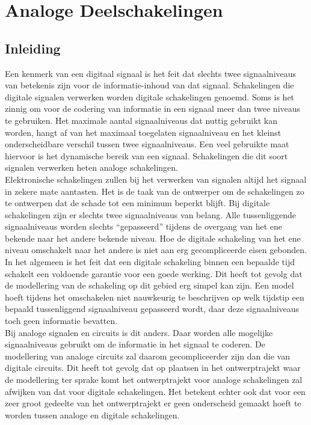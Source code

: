\section{Analoge Deelschakelingen}
\label{analoog}
\subsection{Inleiding}
Een kenmerk van een digitaal signaal is het feit dat slechts twee
signaalniveaus van betekenis zijn voor de informatie-inhoud van dat signaal.
Schakelingen die digitale signalen verwerken worden digitale schakelingen genoemd.
Soms is het zinnig om voor de codering van informatie in een signaal meer dan twee niveaus te gebruiken.
Het maximale aantal signaalniveaus dat nuttig gebruikt kan worden, hangt af van het maximaal toegelaten signaalniveau en het kleinst onderscheidbare verschil tussen twee signaalniveaus.
Een veel gebruikte maat hiervoor is het dynamische bereik van een signaal.
Schakelingen die dit soort signalen verwerken heten analoge schakelingen.
\\
Elektronische schakelingen zullen bij het verwerken van signalen altijd het signaal in zekere mate aantasten.
Het is de taak van de ontwerper om de schakelingen zo te ontwerpen dat de schade tot een minimum beperkt blijft.
Bij digitale schakelingen zijn er slechts twee signaalniveaus van belang.
Alle tussenliggende signaalniveaus worden slechts ``gepasseerd'' tijdens de overgang van het ene bekende naar het andere bekende niveau.
Hoe de digitale schakeling van het ene niveau omschakelt naar het andere is niet aan erg gecompliceerde eisen gebonden.
In het algemeen is het feit dat een digitale schakeling binnen een bepaalde tijd schakelt een voldoende garantie voor een goede werking.
Dit heeft tot gevolg dat de modellering van de schakeling op dit gebied erg simpel kan zijn.
Een model hoeft tijdens het omschakelen niet nauwkeurig te beschrijven op welk tijdstip een bepaald tussenliggend signaalniveau gepasseerd wordt, daar deze signaalniveaus toch geen informatie bevatten.
\\
Bij analoge signalen en circuits is dit anders.
Daar worden alle mogelijke signaalniveaus gebruikt om de informatie in het signaal te coderen.
De modellering van analoge circuits zal daarom gecompliceerder zijn dan die van digitale circuits.
Dit heeft tot gevolg dat op plaatsen in het ontwerptrajekt waar de modellering ter sprake komt het ontwerptrajekt voor analoge schakelingen zal afwijken van dat voor digitale schakelingen.
Het betekent echter ook dat voor een zeer groot gedeelte van het ontwerptrajekt er geen onderscheid gemaakt hoeft te worden tussen analoge en digitale schakelingen.
